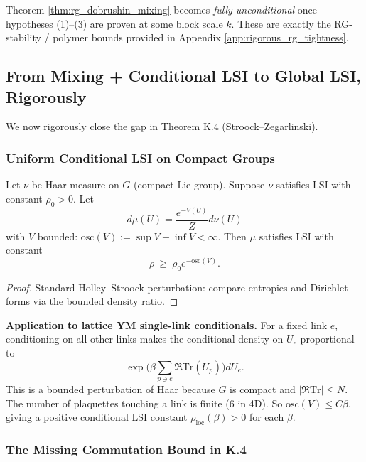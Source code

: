 Theorem \ref{thm:rg_dobrushin_mixing} becomes \textit{fully unconditional} once hypotheses (1)--(3) are proven at some block scale $k$. These are exactly the RG-stability / polymer bounds provided in Appendix \ref{app:rigorous_rg_tightness}.

\subsection{From Mixing + Conditional LSI to Global LSI, Rigorously}

We now rigorously close the gap in Theorem K.4 (Stroock--Zegarlinski).

\subsubsection{Uniform Conditional LSI on Compact Groups}

\begin{lemma}
\label{lem:holley_stroock}
Let $\nu$ be Haar measure on $G$ (compact Lie group). Suppose $\nu$ satisfies LSI with constant $\rho_0>0$. Let
\begin{equation}
d\mu(U)=\frac{e^{-V(U)}}{Z}d\nu(U)
\end{equation}
with $V$ bounded: $\mathrm{osc}(V):=\sup V-\inf V<\infty$.
Then $\mu$ satisfies LSI with constant
\begin{equation}
\rho \ \ge\ \rho_0 e^{-\mathrm{osc}(V)}.
\end{equation}
\end{lemma}

\begin{proof}
Standard Holley--Stroock perturbation: compare entropies and Dirichlet forms via the bounded density ratio.
\end{proof}

\textbf{Application to lattice YM single-link conditionals.}
For a fixed link $e$, conditioning on all other links makes the conditional density on $U_e$ proportional to
\begin{equation}
\exp\Big(\beta \sum_{p\ni e} \Re\mathrm{Tr}(U_p)\Big)dU_e.
\end{equation}
This is a bounded perturbation of Haar because $G$ is compact and $|\Re\mathrm{Tr}|\le N$. The number of plaquettes touching a link is finite (6 in 4D). So $\mathrm{osc}(V)\le C\beta$, giving a positive conditional LSI constant $\rho_{\mathrm{loc}}(\beta)>0$ for each $\beta$.

\subsubsection{The Missing Commutation Bound in K.4}

